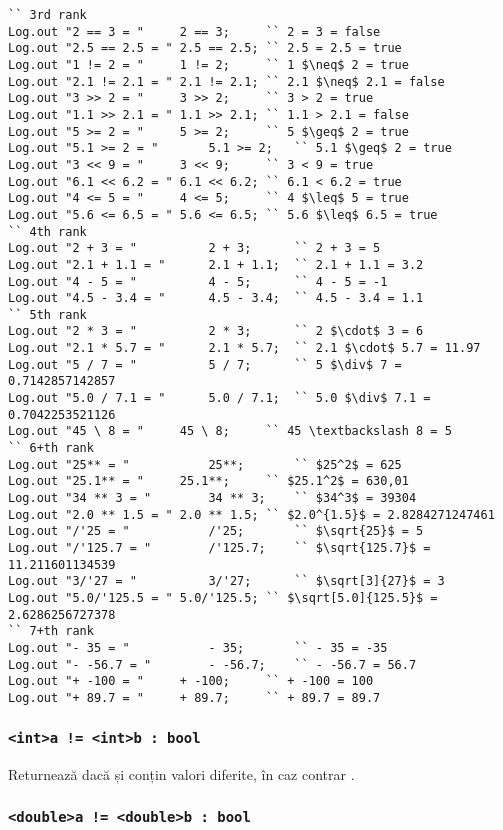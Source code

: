 \begin{lstlisting}[caption=Exemple de folosire al operatorilor asupra tipului int și double, label=numberopex]
`` 3rd rank
Log.out "2 == 3 = "		2 == 3;		`` 2 = 3 = false
Log.out "2.5 == 2.5 = "	2.5 == 2.5;	`` 2.5 = 2.5 = true
Log.out "1 != 2 = "		1 != 2;		`` 1 $\neq$ 2 = true
Log.out "2.1 != 2.1 = "	2.1 != 2.1;	`` 2.1 $\neq$ 2.1 = false
Log.out "3 >> 2 = "		3 >> 2;		`` 3 > 2 = true
Log.out "1.1 >> 2.1 = "	1.1 >> 2.1;	`` 1.1 > 2.1 = false
Log.out "5 >= 2 = "		5 >= 2;		`` 5 $\geq$ 2 = true
Log.out "5.1 >= 2 = "		5.1 >= 2;	`` 5.1 $\geq$ 2 = true
Log.out "3 << 9 = "		3 << 9;		`` 3 < 9 = true
Log.out "6.1 << 6.2 = "	6.1 << 6.2;	`` 6.1 < 6.2 = true
Log.out "4 <= 5 = "		4 <= 5;		`` 4 $\leq$ 5 = true
Log.out "5.6 <= 6.5 = "	5.6 <= 6.5;	`` 5.6 $\leq$ 6.5 = true
`` 4th rank
Log.out "2 + 3 = "			2 + 3;		`` 2 + 3 = 5
Log.out "2.1 + 1.1 = "		2.1 + 1.1;	`` 2.1 + 1.1 = 3.2
Log.out "4 - 5 = "			4 - 5;		`` 4 - 5 = -1
Log.out "4.5 - 3.4 = "		4.5 - 3.4;	`` 4.5 - 3.4 = 1.1
`` 5th rank
Log.out "2 * 3 = "			2 * 3;		`` 2 $\cdot$ 3 = 6
Log.out "2.1 * 5.7 = "		2.1 * 5.7;	`` 2.1 $\cdot$ 5.7 = 11.97
Log.out "5 / 7 = "			5 / 7;		`` 5 $\div$ 7 = 0.7142857142857
Log.out "5.0 / 7.1 = "		5.0 / 7.1;	`` 5.0 $\div$ 7.1 = 0.7042253521126
Log.out "45 \ 8 = "		45 \ 8;		`` 45 \textbackslash 8 = 5
`` 6+th rank
Log.out "25** = "			25**;		`` $25^2$ = 625
Log.out "25.1** = "		25.1**;		`` $25.1^2$ = 630,01
Log.out "34 ** 3 = "		34 ** 3;	`` $34^3$ = 39304
Log.out "2.0 ** 1.5 = "	2.0 ** 1.5;	`` $2.0^{1.5}$ = 2.8284271247461
Log.out "/'25 = "			/'25;		`` $\sqrt{25}$ = 5
Log.out "/'125.7 = "		/'125.7;	`` $\sqrt{125.7}$ = 11.211601134539
Log.out "3/'27 = "			3/'27;		`` $\sqrt[3]{27}$ = 3
Log.out "5.0/'125.5 = "	5.0/'125.5;	`` $\sqrt[5.0]{125.5}$ = 2.6286256727378
`` 7+th rank
Log.out "- 35 = "			- 35;		`` - 35 = -35
Log.out "- -56.7 = "		- -56.7;	`` - -56.7 = 56.7
Log.out "+ -100 = "		+ -100;		`` + -100 = 100
Log.out "+ 89.7 = "		+ 89.7;		`` + 89.7 = 89.7
\end{lstlisting}

\subsubsection{\lstinline|<int>a != <int>b : bool|}

Returnează \true{} dacă  și  conțin valori diferite, în caz contrar \false{}.

\subsubsection{\lstinline|<double>a != <double>b : bool|}

